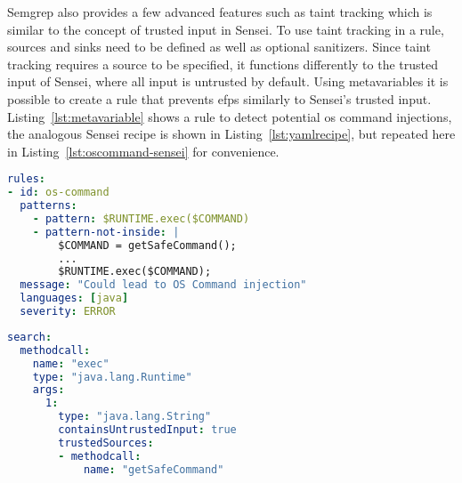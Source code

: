 Semgrep also provides a few advanced features such as taint tracking which is similar to the concept of trusted input in Sensei.
To use taint tracking in a rule, sources and sinks need to be defined as well as optional sanitizers.
Since taint tracking requires a source to be specified, it functions differently to the trusted input of Sensei, where all input is untrusted by default.
Using metavariables it is possible to create a rule that prevents \glspl{efp} similarly to Sensei's trusted input. 
Listing~\ref{lst:metavariable} shows a rule to detect potential \gls{os} command injections, the analogous Sensei recipe is shown in Listing~\ref{lst:yamlrecipe}, but repeated here in Listing~\ref{lst:oscommand-sensei} for convenience.


\begin{minipage}[t]{0.9\linewidth}
\begin{lstlisting}[language={yaml},caption={Any commands passed on to the \texttt{exec} method that have not been retrieved through \texttt{getSafeCommand} will be marked.},label={lst:metavariable},xleftmargin=15pt]
rules:
- id: os-command
  patterns:
    - pattern: $RUNTIME.exec($COMMAND)
    - pattern-not-inside: |
        $COMMAND = getSafeCommand();
        ...
        $RUNTIME.exec($COMMAND);
  message: "Could lead to OS Command injection"
  languages: [java]
  severity: ERROR

\end{lstlisting}

\begin{lstlisting}[language={yaml},caption={Any input is untrusted by default except input retrieved through \texttt{getSafeCommand}. Untrusted input passed on to the \texttt{exec} methodcall will be marked.},label={lst:oscommand-sensei},xleftmargin=15pt]
search:
  methodcall:
    name: "exec"
    type: "java.lang.Runtime"
    args:
      1:
        type: "java.lang.String"
        containsUntrustedInput: true
        trustedSources:
        - methodcall:
            name: "getSafeCommand"
\end{lstlisting}
\end{minipage}